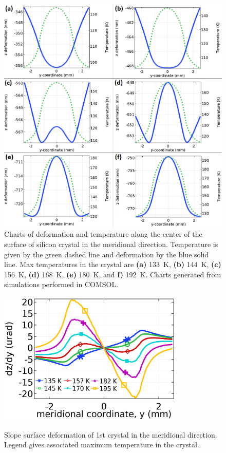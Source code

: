 \documentclass[preprint]{iucr}              %
\begin{document}
\begin{figure}

\caption{Charts of deformation and temperature along the center of the surface of silicon crystal in the meridional direction. Temperature is given by the green dashed line and deformation by the blue solid line. Max temperatures in the crystal are \textbf{(a)} 133~K, \textbf{(b)} 144~K, \textbf{(c)} 156~K, \textbf{(d)} 168~K, \textbf{(e)} 180~K, and \textbf{f)} 192~K. Charts generated from simulations performed in COMSOL.}
\includegraphics[width = \textwidth]{images/deformation.png}

\label{fig:ydeformation}
\end{figure}

\begin{figure}
\caption{Slope surface deformation of 1st crystal in the meridional direction. Legend gives associated maximum temperature in the crystal.}
\includegraphics[width = 8.85cm]{images/slope.png}
\label{fig:yslope}
\end{figure}
\end{document}
